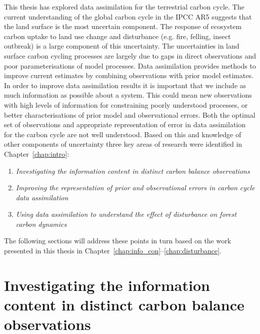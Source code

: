 
This thesis has explored data assimilation for the terrestrial carbon cycle. The current understanding of the global carbon cycle in the IPCC AR5 suggests that the land surface is the most uncertain component. The response of ecosystem carbon uptake to land use change and disturbance (e.g. fire, felling, insect outbreak) is a large component of this uncertainty. The uncertainties in land surface carbon cycling processes are largely due to gaps in direct observations and poor parameterisations of model processes. Data assimilation provides methods to improve current estimates by combining observations with prior model estimates. In order to improve data assimilation results it is important that we include as much information as possible about a system. This could mean new observations with high levels of information for constraining poorly understood processes, or better characterisations of prior model and observational errors. Both the optimal set of observations and appropriate representation of error in data assimilation for the carbon cycle are not well understood. Based on this and knowledge of other components of uncertainty three key areas of research were identified in Chapter~\ref{chap:intro}:
\begin{enumerate}
\item \textit{Investigating the information content in distinct carbon balance observations}

\item \textit{Improving the representation of prior and observational errors in carbon cycle data assimilation}

\item \textit{Using data assimilation to understand the effect of disturbance on forest carbon dynamics}
\end{enumerate}
The following sections will address these points in turn based on the work presented in this thesis in Chapter~\ref{chap:info_con}--\ref{chap:disturbance}.

\section{Investigating the information content in distinct carbon balance observations}

